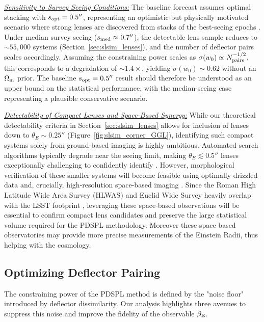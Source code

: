 \documentclass[a4paper,11pt]{article}
\begin{document}
\noindent \underline{\textit{Sensitivity to Survey Seeing Conditions:}}
The baseline forecast assumes optimal stacking with $s_{\rm opt} = 0.5''$, representing an optimistic but physically motivated scenario where strong lenses are discovered from stacks of the best-seeing epochs \citep{Collett:2015}. Under median survey seeing ($s_{\rm med} \approx 0.7''$), the detectable lens sample reduces to $\sim 55,000$ systems (Section~\ref{sec:slsim_lenses}), and the number of deflector pairs scales accordingly. Assuming the constraining power scales as $\sigma(w_0) \propto N_{\rm pairs}^{-1/2}$, this corresponds to a degradation of $\sim 1.4\times$, yielding $\sigma(w_0) \sim 0.62$ without an $\Omega_{\rm m}$ prior. The baseline $s_{\rm opt} = 0.5''$ result should therefore be understood as an upper bound on the statistical performance, with the median-seeing case representing a plausible conservative scenario.

\noindent \underline{\textit{Detectability of Compact Lenses and Space-Based Synergy:}}
While our theoretical detectability criteria in Section~\ref{sec:slsim_lenses} allows for inclusion of lenses down to $\theta_E \sim 0.25''$ (Figure~\ref{fig:slsim_corner_GGL}), identifying such compact systems solely from ground-based imaging is highly ambitious. Automated search algorithms typically degrade near the seeing limit, making $\theta_E \lesssim 0.5''$ lenses exceptionally challenging to confidently identify \cite{Herle:2024, Canameras:2024}. However, morphological verification of these smaller systems will become feasible using optimally drizzled data and, crucially, high-resolution space-based imaging \cite{Silver:2025}. Since the Roman High Latitude Wide Area Survey (HLWAS) and Euclid Wide Survey heavily overlap with the LSST footprint \citep{Capak:2019, ROTAC:2025}, leveraging these space-based observations will be essential to confirm compact lens candidates and preserve the large statistical volume required for the PDSPL methodology. Moreover these space based observatories may provide more precise measurements of the Einstein Radii, thus helping with the cosmology.

\subsection{Optimizing Deflector Pairing}\label{sec:discussion:defl_pairing}
The constraining power of the PDSPL method is defined by the "noise floor" introduced by deflector dissimilarity. Our analysis highlights three avenues to suppress this noise and improve the fidelity of the observable $\beta_{\rm E}$.
\end{document}
